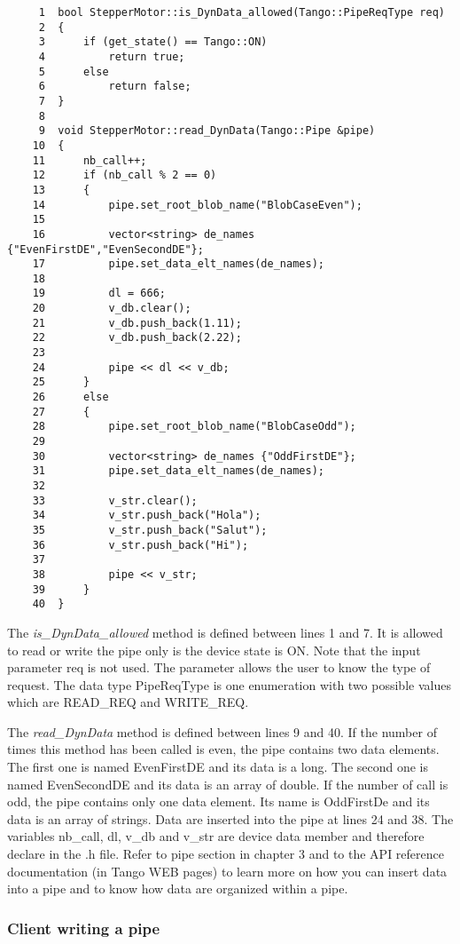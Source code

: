 \begin{verbatim}
     1  bool StepperMotor::is_DynData_allowed(Tango::PipeReqType req)
     2  {
     3      if (get_state() == Tango::ON)
     4          return true;
     5      else
     6          return false;
     7  }
     8
     9  void StepperMotor::read_DynData(Tango::Pipe &pipe)
    10  {
    11      nb_call++;
    12      if (nb_call % 2 == 0)
    13      {
    14          pipe.set_root_blob_name("BlobCaseEven");
    15
    16          vector<string> de_names {"EvenFirstDE","EvenSecondDE"};
    17          pipe.set_data_elt_names(de_names);
    18
    19          dl = 666;
    20          v_db.clear();
    21          v_db.push_back(1.11);
    22          v_db.push_back(2.22);
    23
    24          pipe << dl << v_db;
    25      }
    26      else
    27      {
    28          pipe.set_root_blob_name("BlobCaseOdd");
    29
    30          vector<string> de_names {"OddFirstDE"};
    31          pipe.set_data_elt_names(de_names);
    32
    33          v_str.clear();
    34          v_str.push_back("Hola");
    35          v_str.push_back("Salut");
    36          v_str.push_back("Hi");
    37
    38          pipe << v_str;
    39      }
    40  }
\end{verbatim}


The \emph{is\_DynData\_allowed} method is defined between lines 1
and 7. It is allowed to read or write the pipe only is the device
state is ON. Note that the input parameter req is not used. The parameter
allows the user to know the type of request. The data type PipeReqType
is one enumeration with two possible values which are READ\_REQ and
WRITE\_REQ.

The \emph{read\_DynData} method is defined between lines 9 and 40.
If the number of times this method has been called is even, the pipe
contains two data elements. The first one is named EvenFirstDE and
its data is a long. The second one is named EvenSecondDE and its data
is an array of double. If the number of call is odd, the pipe contains
only one data element. Its name is OddFirstDe and its data is an array
of strings. Data are inserted into the pipe at lines 24 and 38. The
variables nb\_call, dl, v\_db and v\_str are device data member and
therefore declare in the .h file. Refer to pipe section in chapter
3 and to the API reference documentation (in Tango WEB pages) to learn
more on how you can insert data into a pipe and to know how data are
organized within a pipe.


\subsubsection{Client writing a pipe}

